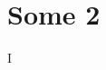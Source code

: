 \documentclass[../main.tex]{subfiles}
\begin{document}
    \chapter{Some 2}
    I~\cite{tectonic}
    \printbibliography
\end{document}

